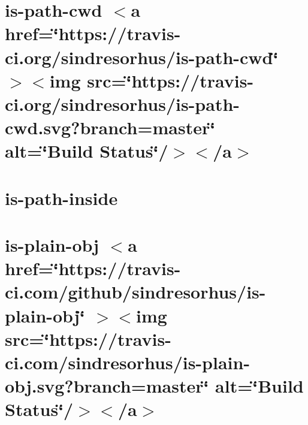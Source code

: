 \documentclass[twoside]{book}
\newcommand{\+}{\discretionary{\mbox{\scriptsize$\hookleftarrow$}}{}{}}
\begin{document}
\chapter{is-\/path-\/cwd \texorpdfstring{$<$}{<}a href=\char`\"{}https\+://travis-\/ci.\+org/sindresorhus/is-\/path-\/cwd\char`\"{} \texorpdfstring{$>$}{>}\texorpdfstring{$<$}{<}img src=\char`\"{}https\+://travis-\/ci.\+org/sindresorhus/is-\/path-\/cwd.\+svg?branch=master\char`\"{} alt=\char`\"{}\+Build Status\char`\"{}/\texorpdfstring{$>$}{>}\texorpdfstring{$<$}{<}/a\texorpdfstring{$>$}{>}}
\label{md__c___users_vaishnavi_jadhav__desktop__developer_code_mean_stack_example_client_node_modules_is_path_cwd_readme}

\chapter{is-\/path-\/inside}
\label{md__c___users_vaishnavi_jadhav__desktop__developer_code_mean_stack_example_client_node_modules_is_path_inside_readme}

\chapter{is-\/plain-\/obj \texorpdfstring{$<$}{<}a href=\char`\"{}https\+://travis-\/ci.\+com/github/sindresorhus/is-\/plain-\/obj\char`\"{} \texorpdfstring{$>$}{>}\texorpdfstring{$<$}{<}img src=\char`\"{}https\+://travis-\/ci.\+com/sindresorhus/is-\/plain-\/obj.\+svg?branch=master\char`\"{} alt=\char`\"{}\+Build Status\char`\"{}/\texorpdfstring{$>$}{>}\texorpdfstring{$<$}{<}/a\texorpdfstring{$>$}{>}}
\label{md__c___users_vaishnavi_jadhav__desktop__developer_code_mean_stack_example_client_node_modules_is_plain_obj_readme}

\end{document}
